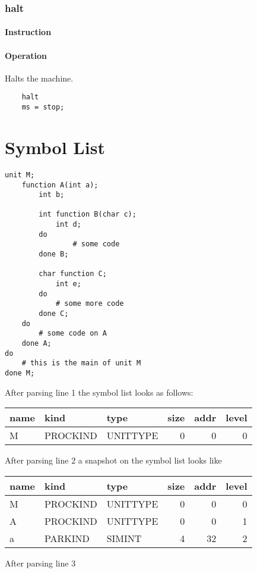 \subsection{halt}
\subsubsection{Instruction}

\subsubsection{Operation}
Halts the machine.

	\begin{lstlisting}
	halt
	ms = stop;
	\end{lstlisting}

\chapter{Symbol List}

\lstset{language=NoBeard,
	numbers=left,
	tabsize=2
}
\begin{lstlisting}
unit M;
	function A(int a);
		int b;
		
		int function B(char c);
			int d;
		do
				# some code
		done B;
		
		char function C;
			int e;
		do
			# some more code
		done C;
	do
		# some code on A
	done A;
do
	# this is the main of unit M
done M;
\end{lstlisting}

After parsing line 1 the symbol list looks as follows:

\begin{tabular}{lllrrr}
name & kind & type & size & addr & level \\
\hline
M & PROCKIND & UNITTYPE & 0 & 0 & 0
\end{tabular}

After parsing line 2 a snapshot on the symbol list looks like

\begin{tabular}{lllrrr}
name & kind & type & size & addr & level \\
\hline
M & PROCKIND & UNITTYPE & 0 & 0 & 0 \\
A & PROCKIND & UNITTYPE & 0 & 0 & 1 \\
a & PARKIND & SIMINT & 4 & 32 & 2
\end{tabular}

After parsing line 3

